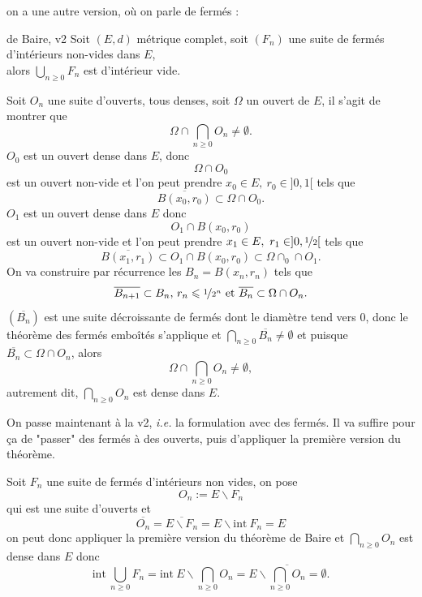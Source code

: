 \documentclass[a4paper,11pt, twoside]{article}
\begin{document}
on a une autre version, où on parle de fermés :

\begin{thC}{de Baire, v2}
  Soit $(E,d)$ métrique complet, soit $(F_n)$ une suite de fermés d'intérieurs non-vides dans $E$,\\

  alors 
  $\bigcup_{n\geqslant 0}F_n$ est d'intérieur vide.
\end{thC}


\begin{Proof}
  Soit $O_n$ une suite d'ouverts, tous denses, soit $\Omega$ un ouvert de $E$, il s'agit de montrer que 
  $$\Omega\cap\bigcap_{n\geqslant 0}O_n\neq \emptyset.$$
  $O_0$ est un ouvert dense dans $E$, donc 
  $$\Omega\cap O_0$$
  est un ouvert non-vide et l'on peut prendre $x_0\in E,\ r_0\in ]0,1[$ tels que
  $$\overline{B(x_0,r_0)}\subset \Omega\cap O_0.$$
  $O_1$ est un ouvert dense dans $E$ donc 
  $$O_1\cap B(x_0,r_0)$$
  est un ouvert non-vide et l'on peut prendre $x_1\in E,\ r_1\in]0,\nicefrac12[$ tels que
  $$\overline{B(x_1,r_1)}\subset O_1\cap B(x_0,r_0)\subset \Omega\cap _0\cap O_1.$$
  On va construire par récurrence les $B_n=B(x_n,r_n)$ tels que
  $$\overline{B_{n+1}}\subset B_n\text{, }r_n\leqslant \nicefrac{1}{2^n}\text{ et }\overline{B_n}\subset \Omega\cap O_n.$$
  $\left(\overline{B_n}\right)$ est une suite décroissante de fermés dont le diamètre tend vers 0, donc le théorème des fermés emboîtés s'applique et $\bigcap_{n\geqslant 0}\overline{B_n}\neq\emptyset$ et puisque $\overline{B_n}\subset \Omega\cap O_n$, alors
  $$\Omega\cap\bigcap_{n\geqslant 0}O_n\neq\emptyset,$$
  autrement dit, $\bigcap_{n\geqslant 0}O_n$ est dense dans $E$.
\end{Proof}


On passe maintenant à la v2, \emph{i.e.} la formulation avec des fermés. Il va suffire pour ça de "passer" des fermés à des ouverts, puis d'appliquer la première version du théorème.\\


\begin{Proof}
  Soit $F_n$ une suite de fermés d'intérieurs non vides, on pose 
  $$O_n:=E\backslash F_n$$
  qui est une suite d'ouverts et 
  $$\overline{O_n}=\overline{E\backslash F_n}=E\backslash \mathrm{int}\ {F_n}=E$$
  on peut donc appliquer la première version du théorème de Baire et $\bigcap_{n\geqslant 0}O_n$ est dense dans $E$ donc
  $$\mathrm{int}\ \bigcup_{n\geqslant 0}F_n=\mathrm{int}\ E\backslash \bigcap_{n\geqslant 0}O_n=E\backslash \overline{\bigcap_{n\geqslant 0}O_n}=\emptyset.$$
\end{Proof}
\end{document}
